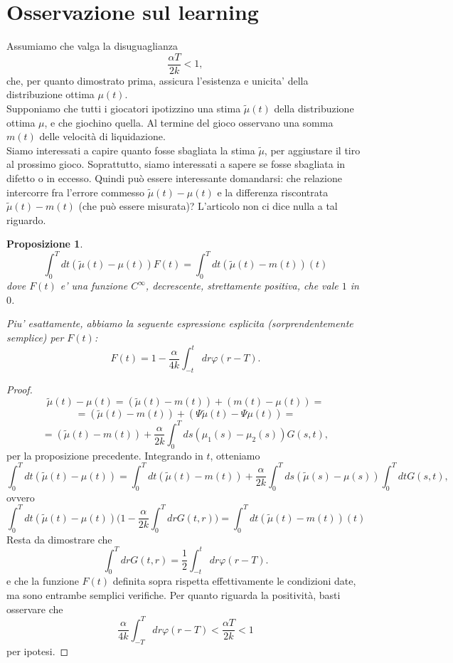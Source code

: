 \documentclass[a4paper]{book}
\theoremstyle{plain}
\newtheorem{prop}[thm]{Proposizione}
\theoremstyle{definizione}
\theoremstyle{remark}
\numberwithin{equation}{section}
\begin{document}
	\section{Osservazione sul learning}
	
	Assumiamo che valga la disuguaglianza $$\frac{\alpha T}{2k}<1,$$ che, per quanto dimostrato prima, assicura l'esistenza e unicita' della distribuzione ottima $\mu(t)$.
	\\
	
	Supponiamo che tutti i giocatori ipotizzino una stima $\tilde\mu(t)$ della distribuzione ottima $\mu$, e che giochino quella. Al termine del gioco osservano una somma $m(t)$ delle velocità di liquidazione. 
	\\
	
	Siamo interessati a capire quanto fosse sbagliata la stima $\tilde\mu$, per aggiustare il tiro al prossimo gioco. Soprattutto, siamo interessati a sapere se fosse sbagliata in difetto o in eccesso. Quindi può essere interessante domandarsi: che relazione intercorre fra l'errore commesso $\tilde\mu(t)-\mu(t)$ e la differenza riscontrata $\tilde\mu(t)-m(t)$ (che può essere misurata)? L'articolo non ci dice nulla a tal riguardo. 
	
	\begin{prop}
	$$\int_0^Tdt (\tilde\mu(t)-\mu(t))F(t)=\int_0^Tdt (\tilde\mu(t)-m(t))(t)$$
	dove $F(t)$ e' una funzione $C^\infty$, decrescente, strettamente positiva, che vale $1$ in $0$.
	
	Piu' esattamente, abbiamo la seguente espressione esplicita (sorprendentemente semplice) per $F(t)$:
	$$F(t)=1-\frac{\alpha}{4k}\int_{-t}^tdr\varphi(r-T).$$
	
	\end{prop}
	\begin{proof}
	$$\tilde\mu(t)-\mu(t)=(\tilde\mu(t)-m(t))+(m(t)-\mu(t))=$$
	$$=(\tilde\mu(t)-m(t))+(\Psi\tilde\mu(t)-\Psi\mu(t))=$$
	$$=(\tilde\mu(t)-m(t))+\frac{\alpha}{2k}\int_0^T ds (\mu_1(s)-\mu_2(s))G(s,t),$$
	per la proposizione precedente. Integrando in $t$, otteniamo
	$$\int_0^T dt (\tilde\mu(t)-\mu(t))=\int_0^T dt(\tilde\mu(t)-m(t))+\frac{\alpha}{2k}\int_0^T ds (\tilde\mu(s)-\mu(s))\int_0^T dt G(s,t),$$ ovvero 
	$$\int_0^Tdt (\tilde\mu(t)-\mu(t)) \bigg(1-\frac{\alpha}{2k}\int_{0}^TdrG(t,r)\bigg)=\int_0^Tdt (\tilde\mu(t)-m(t))(t)$$
	Resta da dimostrare che 
	$$\int_{0}^TdrG(t,r)=\frac{1}{2}\int_{-t}^tdr\varphi(r-T).$$
	e che la funzione $F(t)$ definita sopra rispetta effettivamente le condizioni date, ma sono entrambe semplici verifiche. Per quanto riguarda la positività, basti osservare che 
	$$\frac{\alpha}{4k}\int_{-T}^Tdr\varphi(r-T)< \frac{\alpha T}{2k}<1$$ per ipotesi.
	\end{proof}
	
\end{document}
